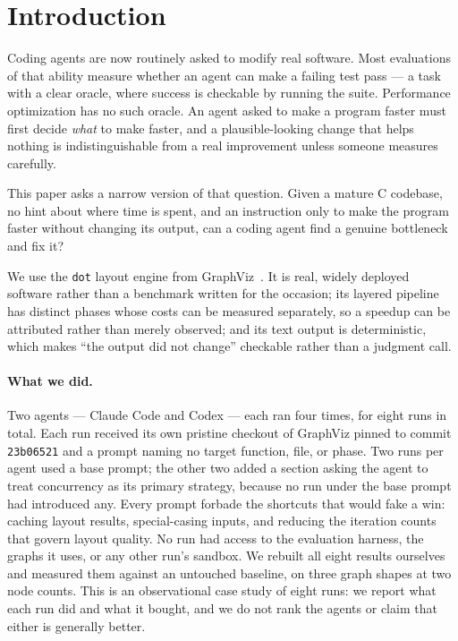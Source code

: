 \section{Introduction}
\label{sec:intro}

Coding agents are now routinely asked to modify real software. Most evaluations
of that ability measure whether an agent can make a failing test pass
\cite{jimenez2024swebench} --- a task with a clear oracle, where success is
checkable by running the suite. Performance optimization has no such oracle. An
agent asked to make a program faster must first decide \emph{what} to make
faster, and a plausible-looking change that helps nothing is indistinguishable
from a real improvement unless someone measures carefully.

This paper asks a narrow version of that question. Given a mature C codebase, no
hint about where time is spent, and an instruction only to make the program
faster without changing its output, can a coding agent find a genuine bottleneck
and fix it?

We use the \texttt{dot} layout engine from GraphViz~\cite{ellson2001graphviz}.
It is real, widely deployed software rather than a benchmark written for the
occasion; its layered pipeline
\cite{sugiyama1981methods,gansner1993technique} has distinct phases whose costs
can be measured separately, so a speedup can be attributed rather than merely
observed; and its text output is deterministic, which makes ``the output did not
change'' checkable rather than a judgment call.

\paragraph{What we did.}
Two agents --- Claude Code and Codex --- each ran four times, for eight runs in
total. Each run received its own pristine checkout of GraphViz pinned to commit
\texttt{23b06521} and a prompt naming no target function, file, or phase. Two
runs per agent used a base prompt; the other two added a section asking the
agent to treat concurrency as its primary strategy, because no run under the
base prompt had introduced any. Every prompt forbade the shortcuts that would
fake a win: caching layout results, special-casing inputs, and reducing the
iteration counts that govern layout quality. No run had access to the evaluation
harness, the graphs it uses, or any other run's sandbox. We rebuilt all eight
results ourselves and measured them against an untouched baseline, on three
graph shapes at two node counts. This is an observational case study of eight
runs: we report what each run did and what it bought, and we do not rank the
agents or claim that either is generally better.

